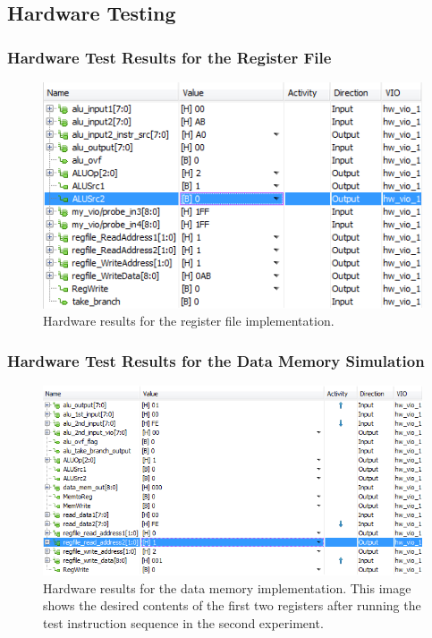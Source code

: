 \documentclass[12pt, letterpaper]{article}
\begin{document}
\subsection{Hardware Testing}

\FloatBarrier
\subsubsection{Hardware Test Results for the Register File}
\begin{figure}[h]
\includegraphics[width=\linewidth]{images/lab4-results-2.png}
\caption{Hardware results for the register file implementation.}
\end{figure}

\FloatBarrier
\subsubsection{Hardware Test Results for the Data Memory Simulation}
\begin{figure}[h]
\includegraphics[width=\linewidth]{images/lab5-results-1.png}
\caption{Hardware results for the data memory implementation.  This image shows the desired contents of the first two registers after running the test instruction sequence in the second experiment.}
\end{figure}
\end{document}
